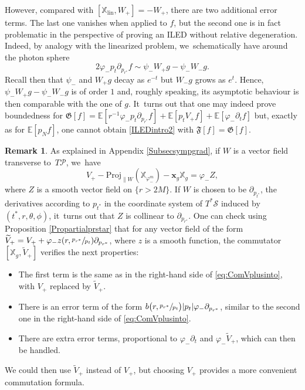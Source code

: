 \documentclass[JEP,XML,SOM,Unicode,published]{cedram}
\theoremstyle{plain}
\theoremstyle{definition}
\newtheorem{remark}[proposition]{Remark}
\newcommand\T{{\mathbb{X}}}
\begin{document}
However, compared with $[\T_{\mathrm{lin}},W_+]=-W_+$, there are two additional error terms. The last one vanishes when applied to $f$, but the second one is in fact problematic in the perspective of proving an ILED without relative degeneration. Indeed, by analogy with the linearized problem, we~schematically have around the photon sphere\vspace*{-3pt}
\begin{equation}\label{eq:heuri}
2\varphi_- p_t \partial_{p_{r^*}} f \sim \psi_- W_+g- \psi_- W_-g.
\end{equation}
Recall then that $\psi_-$ and $W_+ g$ decay as $e^{-t}$ but $W_- g$ grows as $e^t$. Hence, $ \psi_- W_+g- \psi_- W_-g $ is of order $1$ and, roughly speaking, its asymptotic behaviour is then comparable with the one of $g$. It~turns out that one may indeed prove boundedness for $\mathfrak{G}[f]=\mathbb{E} [ r^{-1}\varphi_- p_t \partial_{p_{r^*}} f ]+\mathbb{E} [ p_t V_+ f ]+\mathbb{E}[\varphi_- \partial_t f]$ but, exactly as for $\mathbb{E}[p_N f]$, one cannot obtain \eqref{ILEDintro2} with $\mathfrak{F}[f]=\mathfrak{G}[f]$.

\begin{remark}\label{Rqproj}
As explained in Appendix \ref{Subsecsympgrad}, if $W$ is a vector field transverse to~$T \mathcal{P}$, we~have\vspace*{-5pt}
\[
V_+-\mathrm{Proj}_{\parallel W}(\T_{\varphi_-^m})-\pmb{x}_g \T_g=\varphi_- Z,
\]
where $Z$ is a smooth vector field on $\{ r>2M\}$. If $W$ is chosen to be $\partial_{p_{t^*}}$, the derivatives according to $p_{t^*}$ in the coordinate system of $T^* \mathcal{S}$ induced by $(t^*,r,\theta,\phi)$, it~turns out that $Z$ is collinear to $\partial_{p_{r^*}}$. One can check using Proposition \ref{Propartialprstar} that for any vector field of the form $\widetilde{V}_+=V_++\varphi_- z(r,\sfrac{p_{r^*}}{p_t}) \partial_{p_{r^*}}$, where $z$ is a smooth function, the commutator $[\T_g,\widetilde{V}_+]$ verifies the next properties:
\begin{itemize}
\item The first term is the same as in the right-hand side of \eqref{eq:ComVplusinto}, with $V_+$ replaced by $\widetilde{V}_+$.
\item There is an error term of the form $b\bigl(r,\sfrac{p_{r^*}}{p_t} \bigr)|p_t|\varphi_- \partial_{p_{r^*}}$, similar to the second one in the right-hand side of \eqref{eq:ComVplusinto}.
\item There are extra error terms, proportional to $\varphi_- \partial_t$ and $\varphi_- \widetilde{V}_+$, which can then be handled.
\end{itemize}
We could then use $\widetilde{V}_+$ instead of $V_+$, but choosing $V_+$ provides a more convenient commutation formula.
\end{remark}
\end{document}
